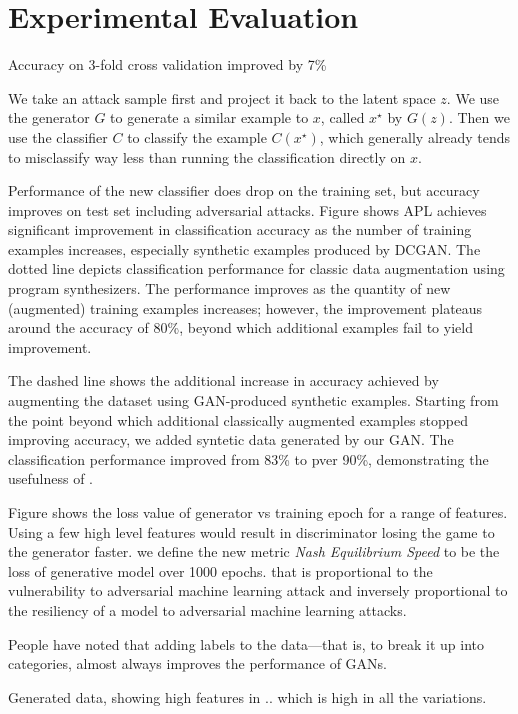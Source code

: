 \section{Experimental Evaluation}\label{results}




Accuracy on 3-fold cross validation improved by 7\%


We take an attack sample first and project it back to the latent space $z$.
We use the generator $G$ to generate a similar example to $x$, called ${x^{\star}}$ by $G(z)$. Then we use the classifier $C$ to classify the example $C(x^{\star})$, which generally already tends to misclassify way less than running the classification directly on $x$. 

Performance of the new classifier does drop on the training set, but accuracy improves on test set including adversarial attacks. Figure shows APL achieves significant improvement in classification accuracy as the number of training examples increases, especially synthetic examples produced by DCGAN. The dotted line depicts classification performance for classic data augmentation using program synthesizers. The performance improves as the quantity of new (augmented) training examples increases; however, the improvement plateaus around the accuracy of 80\%, beyond which additional examples fail to yield improvement. 

The dashed line shows the additional increase in accuracy achieved by augmenting the dataset using GAN-produced synthetic examples. Starting from the point beyond which additional classically augmented examples stopped improving accuracy, we added syntetic data generated by our GAN. The classification performance improved from 83\% to pver 90\%, demonstrating the usefulness of \scheme. 

Figure shows the loss value of generator vs training epoch for a range of features. Using a few high level features would result in discriminator losing the game to the generator faster. we define the new metric {\em Nash Equilibrium Speed} to be the loss of generative model over 1000 epochs. that is proportional to the vulnerability to adversarial machine learning attack and  inversely proportional  to the resiliency of a model to adversarial machine learning attacks. 

People have noted that adding labels to the data—that is, to break it up into categories, almost always improves the performance of GANs.

Generated data, showing high features in .. which is high in all the variations. 



